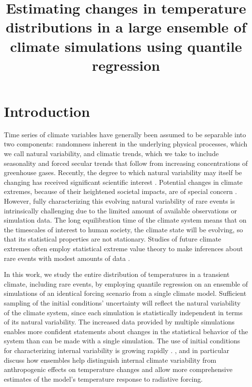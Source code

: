 \documentclass{ametsoc}
\title{Estimating changes in temperature distributions in a large ensemble of climate simulations using quantile regression}
\affiliation{University of Chicago, Chicago, USA}
\begin{document}
	
\maketitle

\section{Introduction}

Time series of climate variables have generally been assumed to be separable into two components: randomness inherent in the underlying physical processes, which we call natural variability, and climatic trends, which we take to include seasonality and  forced secular trends that follow from increasing concentrations of greenhouse gases. Recently, the degree to which natural variability may itself be changing has received significant scientific interest \citep[e.g.][]{trenberth2011attribution, donat2012shifting,deser2012communication, thompson2015quantifying, kay2015community}. Potential changes in climate extremes, because of their heightened societal impacts, are of special concern \citep[e.g.][]{davison1990models, stott2004human, chavez2005generalized, eastoe2009modelling, otto2012reconciling, swain2014extraordinary, singh2014severe, trenberth2015attribution, diffenbaugh2015anthropogenic, huang2015changes, jalbert2017spatiotemporal}. 
However, fully characterizing this evolving natural variability of rare events is intrinsically challenging due to the limited amount of available observations or simulation data. The long equilibration time of the climate system means that on the timescales of interest to human society, the climate state will be evolving, so that its statistical properties are not stationary. Studies of future climate extremes often employ statistical extreme value theory to make inferences about rare events with modest amounts of data \citep{swain2014extraordinary}.

In this work, we study the entire distribution of temperatures in a transient climate, including rare events, by employing quantile regression on an ensemble of simulations of an identical forcing scenario from a single climate model. Sufficient sampling of the initial conditions' uncertainty will reflect the natural variability of the climate system, since each simulation is statistically independent in terms of its natural variability. 
The increased data provided by multiple simulations enables more confident statements about changes in the statistical behavior of the system than can be made with a single simulation. The use of initial conditions for characterizing internal variability is growing rapidly \citep[e.g.][]{deser2012uncertainty, deser2012communication,deser2014projecting,fischer2014detection, kay2015community,sriver2015effects, rodgers2015emergence, hagos2016projection}. \citet{deser2012uncertainty}, \citet{deser2012communication} and \citet{fischer2014detection} in particular discuss how ensembles help distinguish internal climate variability from anthropogenic effects on temperature changes and allow more comprehensive estimates of the model's temperature response to radiative forcing.
\end{document}
